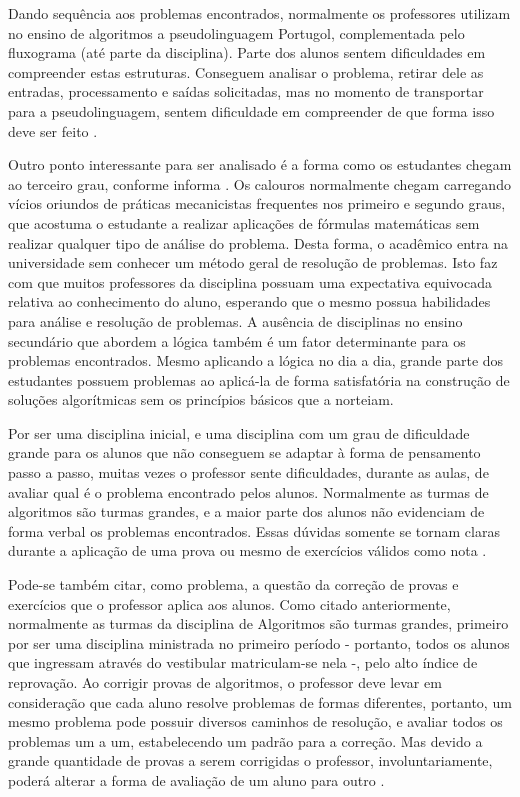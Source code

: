 Dando sequência aos problemas encontrados, normalmente os professores utilizam
no ensino de algoritmos a pseudolinguagem Portugol, complementada pelo
fluxograma (até parte da disciplina). Parte dos alunos sentem dificuldades em
compreender estas estruturas. Conseguem analisar o problema, retirar dele as
entradas, processamento e saídas solicitadas, mas no momento de transportar para
a pseudolinguagem, sentem dificuldade em compreender de que forma isso deve ser
feito \cite{miranda2004}.

Outro ponto interessante para ser analisado é a forma como os estudantes chegam
ao terceiro grau, conforme informa . Os calouros
normalmente chegam carregando vícios oriundos de práticas mecanicistas
frequentes nos primeiro e segundo graus, que acostuma o estudante a realizar
aplicações de fórmulas matemáticas sem realizar qualquer tipo de análise do
problema. Desta forma, o acadêmico entra na universidade sem conhecer um método
geral de resolução de problemas. Isto faz com que muitos professores da
disciplina possuam uma expectativa equivocada relativa ao conhecimento do aluno,
esperando que o mesmo possua habilidades para análise e resolução de problemas.
A ausência de disciplinas no ensino secundário que abordem a lógica também é um
fator determinante para os problemas encontrados. Mesmo aplicando a lógica no
dia a dia, grande parte dos estudantes possuem problemas ao aplicá-la de forma
satisfatória na construção de soluções algorítmicas sem os princípios básicos
que a norteiam.

Por ser uma disciplina inicial, e uma disciplina com um grau de dificuldade
grande para os alunos que não conseguem se adaptar à forma de pensamento passo
a passo, muitas vezes o professor sente dificuldades, durante as aulas, de
avaliar qual é o problema encontrado pelos alunos. Normalmente as turmas de
algoritmos são turmas grandes, e a maior parte dos alunos não evidenciam de
forma verbal os problemas encontrados. Essas dúvidas somente se tornam claras
durante a aplicação de uma prova ou mesmo de exercícios válidos como nota
\cite{miranda2004}.

Pode-se também citar, como problema, a questão da correção de provas e
exercícios que o professor aplica aos alunos. Como citado anteriormente,
normalmente as turmas da disciplina de Algoritmos são turmas grandes, primeiro
por ser uma disciplina ministrada no primeiro período - portanto, todos os
alunos que ingressam através do vestibular matriculam-se nela -, pelo alto
índice de reprovação. Ao corrigir provas de algoritmos, o professor deve levar
em consideração que cada aluno resolve problemas de formas diferentes,
portanto, um mesmo problema pode possuir diversos caminhos de resolução, e
avaliar todos os problemas um a um, estabelecendo um padrão para a correção.
Mas devido a grande quantidade de provas a serem corrigidas o professor,
involuntariamente, poderá alterar a forma de avaliação de um aluno para outro
\cite{miranda2004}.

